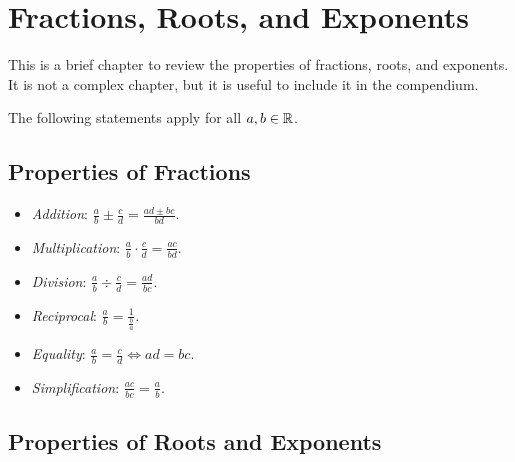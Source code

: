 \chapter{Fractions, Roots, and Exponents}

This is a brief chapter to review the properties of fractions, roots, and exponents. 
It is not a complex chapter, but it is useful to include it in the compendium.

The following statements apply for all \(a, b \in \mathbb{R}\).

\section{Properties of Fractions}

\begin{itemize}

    \item \emph{Addition}: \(\frac{a}{b} \pm \frac{c}{d} = \frac{ad \pm bc}{bd}\).

    \item \emph{Multiplication}: \(\frac{a}{b} \cdot \frac{c}{d} = \frac{ac}{bd}\).
        
    \item \emph{Division}: \(\frac{a}{b} \div \frac{c}{d} = \frac{ad}{bc}\).
   
    \item \emph{Reciprocal}: \(\frac{a}{b} = \frac{1}{\frac{b}{a}}\).
  
    \item \emph{Equality}: \(\frac{a}{b} = \frac{c}{d} \iff ad = bc\).
 
    \item \emph{Simplification}: \(\frac{ac}{bc} = \frac{a}{b}\).

\end{itemize}

\section{Properties of Roots and Exponents}

